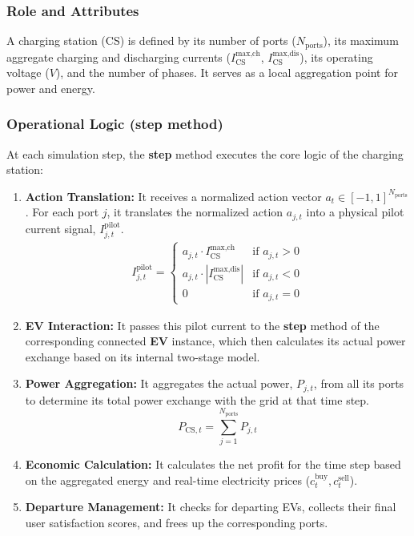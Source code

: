 \subsubsection{Role and Attributes}
A charging station (CS) is defined by its number of ports ($N_{\text{ports}}$), its maximum aggregate charging and discharging currents ($I^{\text{max,ch}}_{\text{CS}}$, $I^{\text{max,dis}}_{\text{CS}}$), its operating voltage ($V$), and the number of phases. It serves as a local aggregation point for power and energy.

\subsubsection{Operational Logic (\textbf{step} method)}
At each simulation step, the \textbf{step} method executes the core logic of the charging station:
\begin{enumerate}
    \item \textbf{Action Translation:} It receives a normalized action vector $a_t \in [-1, 1]^{N_{\text{ports}}}$. For each port $j$, it translates the normalized action $a_{j,t}$ into a physical pilot current signal, $I^{\text{pilot}}_{j,t}$.
    \begin{align}
        I^{\text{pilot}}_{j,t} = 
        \begin{cases} 
            a_{j,t} \cdot I^{\text{max,ch}}_{\text{CS}} & \text{if } a_{j,t} > 0 \\
            a_{j,t} \cdot |I^{\text{max,dis}}_{\text{CS}}| & \text{if } a_{j,t} < 0 \\ 
            0 & \text{if } a_{j,t} = 0
        \end{cases}
    \end{align}
    \item \textbf{EV Interaction:} It passes this pilot current to the \textbf{step} method of the corresponding connected \textbf{EV} instance, which then calculates its actual power exchange based on its internal two-stage model.
    \item \textbf{Power Aggregation:} It aggregates the actual power, $P_{j,t}$, from all its ports to determine its total power exchange with the grid at that time step.
    \begin{equation}
        P_{\text{CS},t} = \sum_{j=1}^{N_{\text{ports}}} P_{j,t}
    \end{equation}
    \item \textbf{Economic Calculation:} It calculates the net profit for the time step based on the aggregated energy and real-time electricity prices ($c^{\text{buy}}_t, c^{\text{sell}}_t$).
    \item \textbf{Departure Management:} It checks for departing EVs, collects their final user satisfaction scores, and frees up the corresponding ports.
\end{enumerate}


